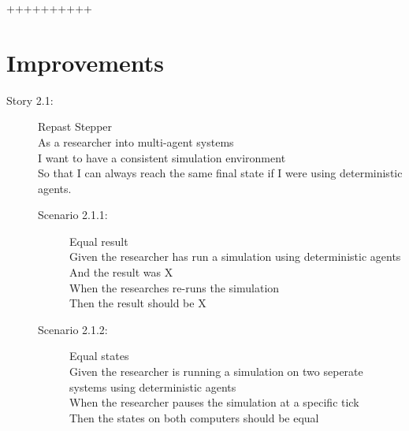 ++++++++++\documentclass{article}
\begin{document}
\section{Improvements}
    \begin{description}
    \item[Story 2.1:] Repast Stepper\\
    As a researcher into multi-agent systems\\
    I want to have a consistent simulation environment\\
    So that I can always reach the same final state if I were using deterministic agents.
    
        \begin{description}
        \item[Scenario 2.1.1:] Equal result\\
        Given the researcher has run a simulation using deterministic agents\\
        And the result was X\\
        When the researches re-runs the simulation\\
        Then the result should be X
        
        \item[Scenario 2.1.2:] Equal states\\
        Given the researcher is running a simulation on two seperate systems using deterministic agents\\
        When the researcher pauses the simulation at a specific tick\\
        Then the states on both computers should be equal
    \end{description}
\end{description}
\end{document}
